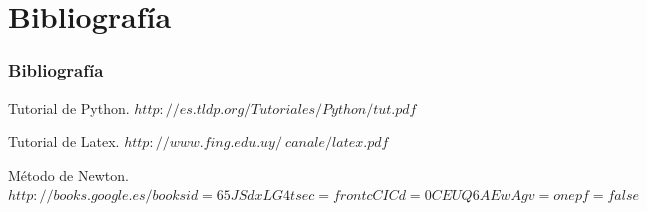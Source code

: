 \documentclass{beamer}
\begin{document}
\section{Bibliografía}
\begin{frame}
\frametitle{Bibliografía}

\begin{thebibliography}{10}

     Tutorial de Python. 
     {\small$http://es.tldp.org/Tutoriales/Python/tut.pdf$}

   
     Tutorial de Latex. 
     {\small $http://www.fing.edu.uy/~canale/latex.pdf$}

     M\'etodo de Newton. 
     {\small $http://books.google.es/booksid=65JSdxLG4tsec=frontcCICd=0CEUQ6AEwAgv=onepf=false$}
   
\end{thebibliography}
\end{frame}

\end{document}
